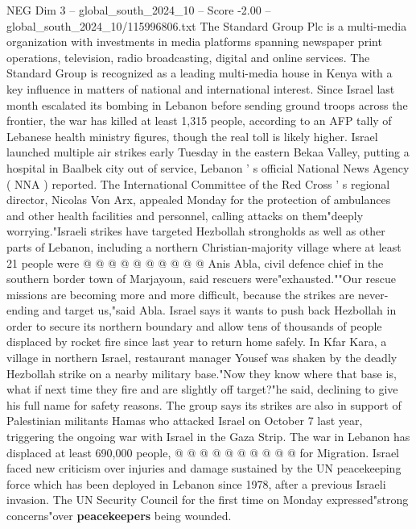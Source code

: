\begin{textsample}{NEG Dim 3 – global\_south\_2024\_10 – Score -2.00 – global\_south\_2024\_10/115996806.txt}  \label{ex:f3_neg_097}
The Standard Group Plc is a multi-media organization with investments in media platforms spanning newspaper print operations, television, radio broadcasting, digital and online services.
The Standard Group is recognized as a leading multi-media house in Kenya with a key influence in matters of national and international interest.
Since Israel last month escalated its bombing in Lebanon before sending ground troops across the frontier, the war has killed at least 1,315 people, according to an AFP tally of Lebanese health ministry figures, though the real toll is likely higher.
Israel launched multiple air strikes early Tuesday in the eastern Bekaa Valley, putting a hospital in Baalbek city out of service, Lebanon ' s official National News Agency ( NNA ) reported.
The International Committee of the Red Cross ' s regional director, Nicolas Von Arx, appealed Monday for the protection of ambulances and other health facilities and personnel, calling attacks on them"deeply worrying."Israeli strikes have targeted Hezbollah strongholds as well as other parts of Lebanon, including a northern Christian-majority village where at least 21 people were @ @ @ @ @ @ @ @ @ @ Anis Abla, civil defence chief in the southern border town of Marjayoun, said rescuers were"exhausted.""Our rescue missions are becoming more and more difficult, because the strikes are never-ending and target us,"said Abla.
Israel says it wants to push back Hezbollah in order to secure its northern boundary and allow tens of thousands of people displaced by rocket fire since last year to return home safely.
In Kfar Kara, a village in northern Israel, restaurant manager Yousef was shaken by the deadly Hezbollah strike on a nearby military base."Now they know where that base is, what if next time they fire and are slightly off target?"he said, declining to give his full name for safety reasons.
The group says its strikes are also in support of Palestinian militants Hamas who attacked Israel on October 7 last year, triggering the ongoing war with Israel in the Gaza Strip.
The war in Lebanon has displaced at least 690,000 people, @ @ @ @ @ @ @ @ @ @ for Migration.
Israel faced new criticism over injuries and damage sustained by the UN peacekeeping force which has been deployed in Lebanon since 1978, after a previous Israeli invasion.
The UN Security Council for the first time on Monday expressed"strong concerns"over \textbf{peacekeepers} being wounded.

\end{textsample}
